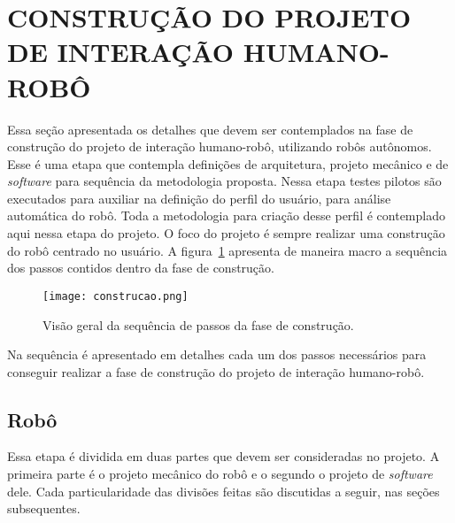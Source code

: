 \section{CONSTRUÇÃO DO PROJETO DE INTERAÇÃO HUMANO-ROBÔ}
\label{sec:construcao}
Essa seção apresentada os detalhes que devem ser contemplados na fase de construção do projeto de interação humano-robô, utilizando robôs autônomos. Esse é uma etapa que contempla definições de arquitetura, projeto mecânico e de \textit{software} para sequência da metodologia proposta. Nessa etapa testes pilotos são executados para auxiliar na definição do perfil do usuário, para análise automática do robô. Toda a metodologia para criação desse perfil é contemplado aqui nessa etapa do projeto. O foco do projeto é sempre realizar uma construção do robô centrado no usuário. A figura~\ref{fig:construcao} apresenta de maneira macro a sequência dos passos contidos dentro da fase de construção.

\begin{figure}[ht!]
    \centering
    \begin{minipage}{\textwidth}
        \caption{Visão geral da sequência de passos da fase de construção.}
        \texttt{[image: construcao.png]}
        \label{fig:construcao}
    \end{minipage}
\end{figure}

Na sequência é apresentado em detalhes cada um dos passos necessários para conseguir realizar a fase de construção do projeto de interação humano-robô.

\subsection{Robô}
\label{sec:robo}
Essa etapa é dividida em duas partes que devem ser consideradas no projeto. A primeira parte é o projeto mecânico do robô e o segundo o projeto de \textit{software} dele. Cada particularidade das divisões feitas são discutidas a seguir, nas seções subsequentes.


